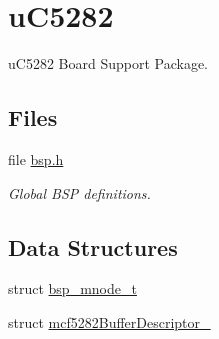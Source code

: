 \hypertarget{group__RTEMSBSPsM68kUC5282}{}\section{u\+C5282}
\label{group__RTEMSBSPsM68kUC5282}


u\+C5282 Board Support Package.  


\subsection*{Files}
\begin{DoxyCompactItemize}
\item 
file \mbox{\hyperlink{bsps_2m68k_2uC5282_2include_2bsp_8h}{bsp.\+h}}
\begin{DoxyCompactList}\small\item\em Global B\+SP definitions. \end{DoxyCompactList}\end{DoxyCompactItemize}
\subsection*{Data Structures}
\begin{DoxyCompactItemize}
\item 
struct \mbox{\hyperlink{structbsp__mnode__t}{bsp\+\_\+mnode\+\_\+t}}
\item 
struct \mbox{\hyperlink{structmcf5282BufferDescriptor__}{mcf5282\+Buffer\+Descriptor\+\_\+}}
\end{DoxyCompactItemize}
